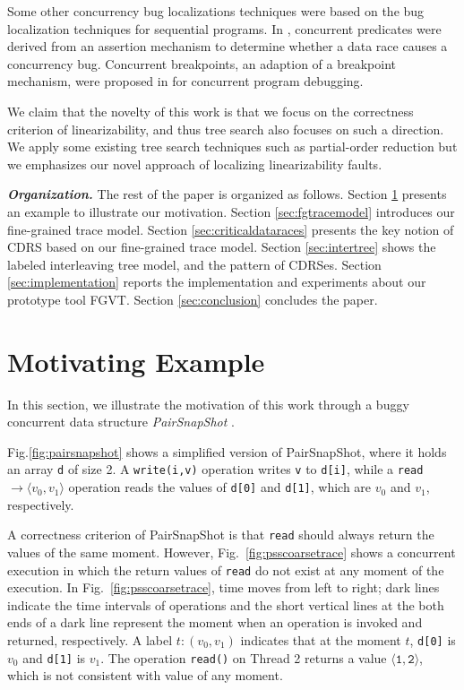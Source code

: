 \documentclass[runningheads]{llncs}
\newcommand{\pair}[1]{{\langle{#1}\rangle}}
\begin{document}
Some other concurrency bug localizations techniques were based on the bug localization techniques for sequential programs. In \cite{DBLP:conf/IEEEpact/GottschlichPPW13}, concurrent predicates were derived from an assertion mechanism to determine whether a data race causes a concurrency bug. Concurrent breakpoints, an adaption of a breakpoint mechanism, were proposed in \cite{DBLP:conf/ppopp/ParkS12} for concurrent program debugging.

We claim that the novelty of this work is that we focus on the correctness criterion of linearizability, and thus tree search also focuses on such a direction. We apply some 
existing tree search techniques such as partial-order reduction but we emphasizes our novel approach of localizing linearizability faults.


\noindent\textbf{\textit{Organization.}} The rest of the paper is organized as follows. Section \ref{sec:motivatingeg} presents an example to illustrate our motivation. Section \ref{sec:fgtracemodel} introduces our fine-grained trace model. Section \ref{sec:criticaldataraces} presents the key notion of CDRS based on our fine-grained trace model. Section \ref{sec:intertree} shows the labeled interleaving tree model, and the pattern of CDRSes. Section \ref{sec:implementation} reports the implementation and experiments about our prototype tool FGVT. Section \ref{sec:conclusion} concludes the paper.

\vspace{-0.2cm}

\section{Motivating Example}\label{sec:motivatingeg}







In this section, we illustrate the motivation of this work through a buggy concurrent data structure \textit{PairSnapShot} \cite{DBLP:conf/sac/LongZ16}.


Fig.\ref{fig:pairsnapshot} shows a simplified version of PairSnapShot, where it holds an array \texttt{d} of size 2. A \texttt{write(i,v)} operation writes \texttt{v} to \texttt{d[i]}, while a \texttt{read} \texttt{$\to \langle v_0,v_1\rangle$} operation reads the values of \texttt{d[0]} and \texttt{d[1]}, which are $v_0$ and $v_1$, respectively.

 A correctness criterion of PairSnapShot is that \texttt{read} should always return the values of the same moment. However, 
Fig.~\ref{fig:psscoarsetrace} shows a concurrent execution in which the return values of \texttt{read} do not exist at any moment of the execution. 
In Fig.~\ref{fig:psscoarsetrace}, time moves from left to right; dark lines indicate the time intervals of operations and  
the short vertical lines at the both ends of a dark line represent the moment when an operation is invoked and returned, respectively.
A label ${t:(v_0,v_1)}$ indicates that at the moment $t$,  \texttt{d[0]} is $v_0$ and \texttt{d[1]} is $v_1$.
  The operation \texttt{read()} on Thread 2 returns a value $\mathtt{\pair{1,2}}$,
  which is not consistent with value of any moment. 
  
\end{document}
